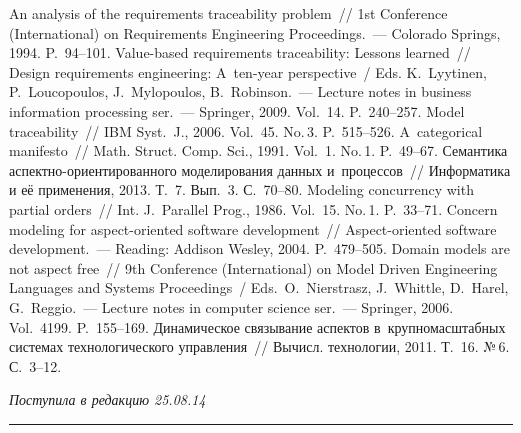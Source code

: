 \begin{multicols}{2}
{{\begin{thebibliography}{99}
 An analysis of the requirements traceability problem~// 1st
Conference (International) on Requirements Engineering Proceedings.~--- Colorado Springs, 1994.
P.~94--101.
 Value-based requirements
traceability: Lessons learned~// Design requirements engineering:
A~ten-year perspective~/ Eds.
K.~Lyytinen, P.~Loucopoulos, J.~Mylopoulos, B.~Robinson.~---
Lecture notes in business information processing ser.~---
Springer, 2009. Vol.~14.
P.~240--257.
 Model traceability~// IBM
Syst.~J., 2006. Vol.~45. No.\,3. P.~515--526.
 A~categorical manifesto~// Math. Struct. Comp. Sci., 1991. Vol.~1. No.\,1.
P.~49--67.
 Семантика аспектно-ори\-ен\-ти\-ро\-ван\-но\-го моделирования данных
и~процессов~// Информатика и её применения, 2013. Т.~7. Вып.~3. С.~70--80.
 Modeling concurrency with partial orders~// Int. J.~Parallel Prog., 1986.
Vol.~15. No.\,1. P.~33--71.
 Concern modeling for aspect-oriented software development~//
Aspect-oriented software development.~--- Reading: Addison Wesley, 2004. P.~479--505.
 Domain models are not aspect free~//
9th Conference (International) on Model Driven Engineering Languages and
Systems Proceedings~/ Eds.\ O.~Nierstrasz, J.~Whittle, D.~Harel, G.~Reggio.~---
Lecture notes in computer science ser.~--- Springer,
2006. Vol.~4199. P.~155--169.
 Динамическое связывание аспектов
в~крупномасштабных системах технологического управления~// Вычисл. технологии, 2011.
Т.~16. №\,6. С.~3--12.

 \end{thebibliography}

 }
 }

\end{multicols}

\vspace*{-3pt}

\hfill{\small\textit{Поступила в редакцию 25.08.14}}


\vspace*{12pt}

\hrule

\vspace*{2pt}

